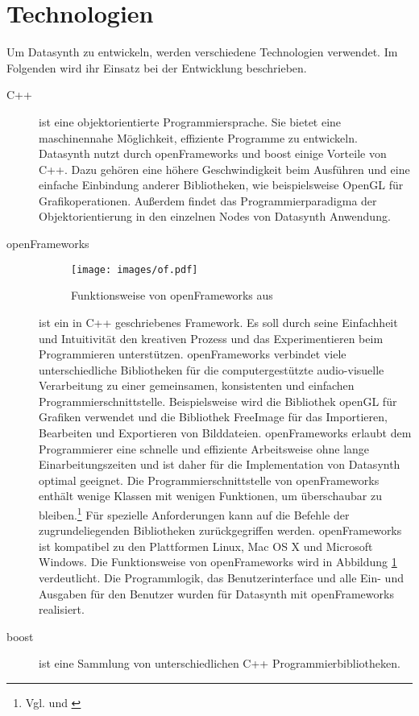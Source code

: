\documentclass[a4paper, 
               12pt,
               DIV=calc,
               version=first,
               pdftex,
               headsepline,
               footsepline,
               bibtotocnumbered,
               liststotocnumbered]{scrreprt}
\begin{document}
\section{Technologien}
\label{sec:Technologien}
Um Datasynth zu entwickeln, werden verschiedene Technologien verwendet.
Im Folgenden wird ihr Einsatz bei der Entwicklung beschrieben.
\begin{description}
\item[C++]
ist eine objektorientierte Programmiersprache. Sie bietet
eine maschinennahe Möglichkeit, effiziente Programme zu entwickeln.
Datasynth nutzt durch openFrameworks und boost einige Vorteile
von C++. Dazu gehören eine höhere Geschwindigkeit beim Ausführen
und eine einfache Einbindung anderer Bibliotheken, wie 
beispielsweise OpenGL für Grafikoperationen. Außerdem
findet das Programmierparadigma der Objektorientierung
in den einzelnen Nodes von Datasynth Anwendung.
\item[openFrameworks]
\begin{figure}
\centering
\texttt{[image: images/of.pdf]}
\caption{Funktionsweise von openFrameworks aus \citep{of_wiki}}
\label{fig:of}
\end{figure}
ist ein in C++ geschriebenes Framework. Es soll durch seine
Einfachheit und Intuitivität den kreativen Prozess und das
Experimentieren beim Programmieren unterstützen. openFrameworks
verbindet viele unterschiedliche Bibliotheken für die
computergestützte audio-visuelle Verarbeitung zu einer gemeinsamen,
konsistenten und einfachen Programmierschnittstelle. Beispielsweise
wird die Bibliothek openGL für Grafiken verwendet und die
Bibliothek FreeImage für das Importieren, Bearbeiten und Exportieren von Bilddateien.
openFrameworks erlaubt dem Programmierer eine schnelle und effiziente Arbeitsweise ohne
lange Einarbeitungszeiten und ist daher für die Implementation von Datasynth optimal geeignet.
Die Programmierschnittstelle von openFrameworks enthält
wenige Klassen mit wenigen Funktionen, um überschaubar zu bleiben.\footnote{Vgl. \citep{of1} und \citep{of2}}
Für spezielle Anforderungen kann auf die Befehle der zugrundeliegenden Bibliotheken
zurückgegriffen werden.
openFrameworks ist kompatibel zu den Plattformen
Linux, Mac OS X und Microsoft Windows.
Die Funktionsweise von openFrameworks wird in Abbildung
\ref{fig:of} verdeutlicht. 
Die Programmlogik, das Benutzerinterface und alle Ein- und
Ausgaben für den Benutzer wurden für Datasynth mit openFrameworks
realisiert.
\item[boost]
ist eine Sammlung von unterschiedlichen C++ Programmierbibliotheken.

\end{description}
\end{document}
